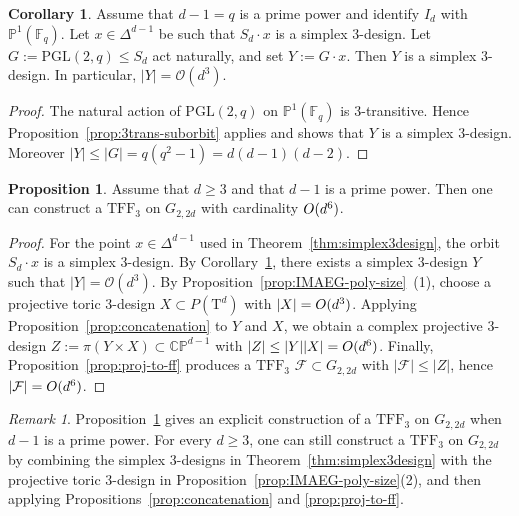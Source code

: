 \documentclass{amsart}
\theoremstyle{definition}
\newtheorem{proposition}[theorem]{Proposition}
\newtheorem{corollary}[theorem]{Corollary}
\theoremstyle{remark}
\newtheorem{remark}[theorem]{Remark}
\numberwithin{equation}{section}
\newcommand{\CP}{\mathbb{CP}}
\newcommand{\TFF}{\mathrm{TFF}}
\newcommand{\order}{\mathcal{O}}
\begin{document}
\begin{corollary}\label{cor:pgl-thinning-simplex3}
Assume that $d-1=q$ is a prime power and identify $I_d$ with $\mathbb P^1(\mathbb F_q)$.
Let $x\in\Delta^{d-1}$ be such that $S_d\cdot x$ is a simplex $3$-design.
Let $G:=\mathrm{PGL}(2,q)\le S_d$ act naturally, and set $Y:=G\cdot x$.
Then $Y$ is a simplex $3$-design. In particular,  $|Y|=\mathcal{O}(d^3)$.
\end{corollary}


\begin{proof}
The natural action of $\mathrm{PGL}(2,q)$ on $\mathbb P^1(\mathbb F_q)$ is $3$-transitive.
Hence Proposition~\ref{prop:3trans-suborbit} applies and shows that $Y$ is a simplex $3$-design.
Moreover $|Y|\le |G|=q(q^2-1)=d(d-1)(d-2)$.
\end{proof}

\begin{proposition}\label{prop:tff3-size-d6}
Assume that $d\ge 3$ and that $d-1$ is a prime power.
Then one can construct a $\TFF_3$ on $G_{2,2d}$ with cardinality $\mathcal \order(d^{6})$.
\end{proposition}

\begin{proof}
For the point $x\in\Delta^{d-1}$ used in
Theorem~\ref{thm:simplex3design},
the orbit $S_d\cdot x$ is a simplex $3$-design.
By Corollary~\ref{cor:pgl-thinning-simplex3}, there exists a simplex $3$-design $Y$ such that $|Y|=\order(d^3)$. By Proposition~\ref{prop:IMAEG-poly-size}~(1), choose a projective toric $3$-design
$X\subset P(\mathrm T^d)$ with $|X|=\mathcal \order(d^3)$.
Applying Proposition~\ref{prop:concatenation} to $Y$ and $X$, we obtain a complex projective $3$-design
\(
Z:=\pi(Y\times X)\subset \CP^{d-1}
\)
with $|Z|\le |Y||X|=\mathcal \order(d^6)$.
Finally, Proposition~\ref{prop:proj-to-ff} produces a $\TFF_3$ $\mathcal{F}\subset G_{2,2d}$ with $|\mathcal{F}|\le |Z|$,
hence $|\mathcal{F}|=\mathcal \order(d^6)$.
\end{proof}

\begin{remark}\label{rem:tff3-existence}
Proposition~\ref{prop:tff3-size-d6} gives an explicit construction of a $\TFF_3$ on $G_{2,2d}$ when $d-1$ is a prime power.
For every $d\ge 3$, one can still construct a $\TFF_3$ on $G_{2,2d}$ by combining the simplex $3$-designs in
Theorem~\ref{thm:simplex3design}
with the projective toric $3$-design in Proposition~\ref{prop:IMAEG-poly-size}(2),
and then applying Propositions~\ref{prop:concatenation} and \ref{prop:proj-to-ff}.
\end{remark}
\end{document}
